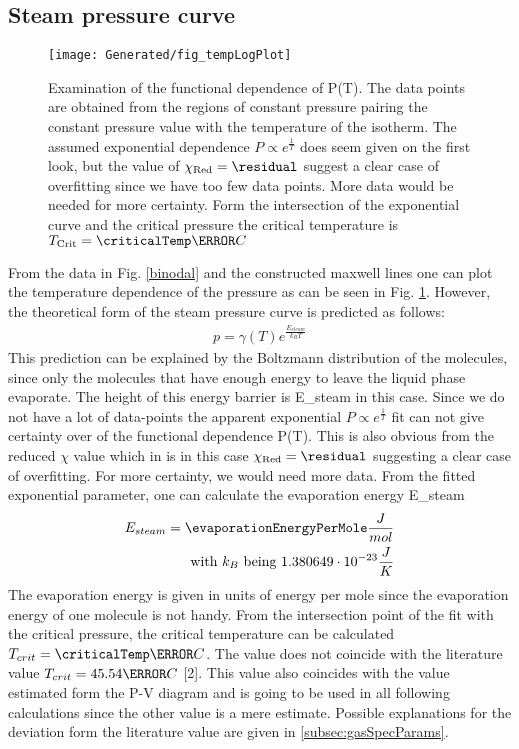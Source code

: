 \documentclass[a4paper,10pt,twocolumn]{article}
\begin{document}
    \subsection{Steam pressure curve}\label{subsec:steamPressureCurve}
    \begin{figure}
        \begin{center}
            \texttt{[image: Generated/fig\_tempLogPlot]}
            \caption[]{Examination of the functional dependence of P(T). The data points are obtained from the regions of constant pressure pairing the constant pressure value with the temperature of the isotherm.
            The assumed exponential dependence $P \propto e^{\frac{1}{T}} $ does seem given on the first look, but the value of $\chi_{\text{Red}}=\residual$ suggest a clear case of overfitting since we have
            too few data points. More data would be needed for more certainty. Form the intersection of the exponential curve and the critical pressure the critical temperature is $T_{\text{Crit}}=\criticalTemp\degree C$}
            \label{fig:tempLogPLot}
        \end{center}
    \end{figure}
    From the data in Fig. \ref{binodal} and the constructed maxwell lines one can plot the temperature dependence of the pressure as can be seen in Fig. \ref{fig:tempLogPLot}.
    However, the theoretical form of the steam pressure curve is predicted as follows:
    \begin{align}
        p=\gamma(T)e^\frac{E_{steam}}{k_B T}
    \end{align}
    This prediction can be explained by the Boltzmann distribution of the molecules, since only the molecules that have enough energy to leave the liquid phase evaporate.
    The height of this energy barrier is E_{steam}\) in this case.
    Since we do not have a lot of data-points the apparent exponential $P \propto e^{\frac{1}{T}} $ fit can not give certainty over of the functional dependence P(T).
    This is also obvious from the reduced $\chi$ value which in is in this case $\chi_{\text{Red}}=\residual$ suggesting a clear case of overfitting.
    For more certainty, we would need more data.
    From the fitted exponential parameter, one can calculate the evaporation energy E_{steam}\)
    \begin{align}
        E_{steam} = \evaporationEnergyPerMole \frac{J}{mol}
        \endline \text{with } k_B \text{ being } 1.380649\cdot 10^{-23}\frac{J}{K}
    \end{align}
    The evaporation energy is given in units of energy per mole since the evaporation energy of one molecule is not handy. 
    From the intersection point of the fit with the critical pressure, the critical temperature can be calculated $T_{crit}=\criticalTemp\degree C $.
    The value does not coincide with the literature value $T_{crit} = 45.54\degree C$ [2].
    This value also coincides with the value estimated form the P-V diagram and is going to be used in all following calculations since the other value is a mere estimate.
    Possible explanations for the deviation form the literature value are given in \autoref{subsec:gasSpecParams}.
\end{document}
